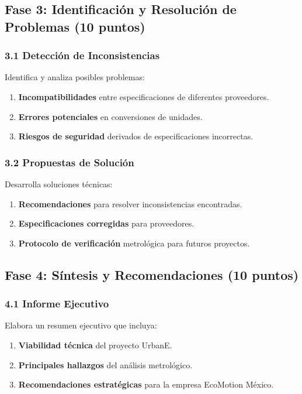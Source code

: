 \documentclass{article}
\begin{document}
\subsection*{Fase 3: Identificación y Resolución de Problemas (10 puntos)}

\subsubsection*{3.1 Detección de Inconsistencias}
Identifica y analiza posibles problemas:
\begin{enumerate}
    \item \textbf{Incompatibilidades} entre especificaciones de diferentes proveedores.
    \item \textbf{Errores potenciales} en conversiones de unidades.
    \item \textbf{Riesgos de seguridad} derivados de especificaciones incorrectas.
\end{enumerate}

\subsubsection*{3.2 Propuestas de Solución}
Desarrolla soluciones técnicas:
\begin{enumerate}
    \item \textbf{Recomendaciones} para resolver inconsistencias encontradas.
    \item \textbf{Especificaciones corregidas} para proveedores.
    \item \textbf{Protocolo de verificación} metrológica para futuros proyectos.
\end{enumerate}

\subsection*{Fase 4: Síntesis y Recomendaciones (10 puntos)}

\subsubsection*{4.1 Informe Ejecutivo}
Elabora un resumen ejecutivo que incluya:
\begin{enumerate}
    \item \textbf{Viabilidad técnica} del proyecto UrbanE.
    \item \textbf{Principales hallazgos} del análisis metrológico.
    \item \textbf{Recomendaciones estratégicas} para la empresa EcoMotion México.
\end{enumerate}
\end{document}
